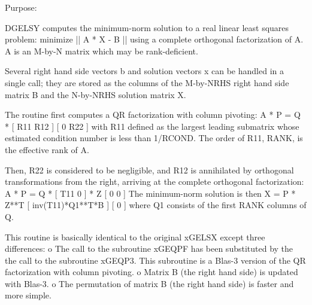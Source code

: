  \begin{DoxyParagraph}{Purpose\+: }
\begin{DoxyVerb} DGELSY computes the minimum-norm solution to a real linear least
 squares problem:
     minimize || A * X - B ||
 using a complete orthogonal factorization of A.  A is an M-by-N
 matrix which may be rank-deficient.

 Several right hand side vectors b and solution vectors x can be
 handled in a single call; they are stored as the columns of the
 M-by-NRHS right hand side matrix B and the N-by-NRHS solution
 matrix X.

 The routine first computes a QR factorization with column pivoting:
     A * P = Q * [ R11 R12 ]
                 [  0  R22 ]
 with R11 defined as the largest leading submatrix whose estimated
 condition number is less than 1/RCOND.  The order of R11, RANK,
 is the effective rank of A.

 Then, R22 is considered to be negligible, and R12 is annihilated
 by orthogonal transformations from the right, arriving at the
 complete orthogonal factorization:
    A * P = Q * [ T11 0 ] * Z
                [  0  0 ]
 The minimum-norm solution is then
    X = P * Z**T [ inv(T11)*Q1**T*B ]
                 [        0         ]
 where Q1 consists of the first RANK columns of Q.

 This routine is basically identical to the original xGELSX except
 three differences:
   o The call to the subroutine xGEQPF has been substituted by the
     the call to the subroutine xGEQP3. This subroutine is a Blas-3
     version of the QR factorization with column pivoting.
   o Matrix B (the right hand side) is updated with Blas-3.
   o The permutation of matrix B (the right hand side) is faster and
     more simple.\end{DoxyVerb}
 
\end{DoxyParagraph}

